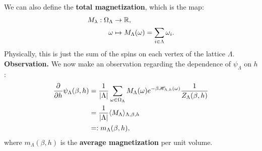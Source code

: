 \documentclass{article}
\begin{document}
We can also define the \textbf{total magnetization}, which is the map:
\begin{align}
  M_{\lambda} : \Omega_{\Lambda} &\to \mathbb{R}, \\
  \omega &\mapsto M_{\Lambda}(\omega) = \sum\limits_{i \in \Lambda} \omega_i.
\end{align}
Physically, this is just the sum of the spins on each vertex of the lattice $\Lambda$.\\

\noindent\textbf{Observation.} We now make an observation regarding the dependence of $\psi_{\Lambda}$ on $h$:
\begin{align}
\label{eq:6}
  \frac{\partial}{\partial h} \psi_{\Lambda}(\beta,h) &= \frac{1}{|\Lambda|}\sum\limits_{\omega\in\Omega_{\Lambda}} M_{\Lambda}(\omega) e^{-\beta\mathscr{H}_{\Lambda,h}(\omega)} \frac{1}{Z_{\Lambda}(\beta,h)} \\
                                                      &= \frac{1}{|\Lambda|} \langle M_{\Lambda} \rangle_{\Lambda, \beta, h} \\
  &=: m_{\Lambda}(\beta, h),
\end{align}
where $m_{\Lambda}(\beta, h)$ is the \textbf{average magnetization} per unit volume.

\printindex
\end{document}
